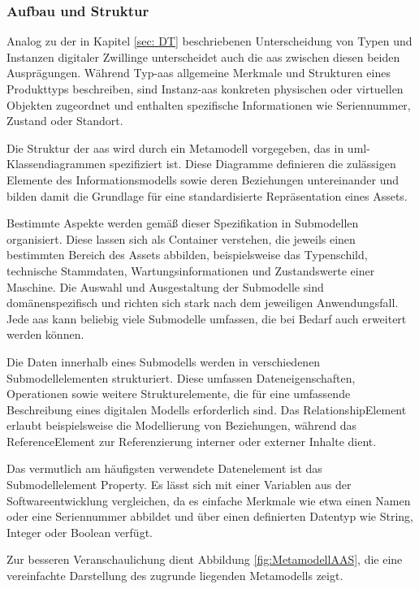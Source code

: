 \subsubsection{Aufbau und Struktur}
Analog zu der in Kapitel \ref{sec: DT} beschriebenen Unterscheidung von Typen und Instanzen digitaler Zwillinge unterscheidet auch die \acs{aas} zwischen diesen beiden Ausprägungen.
Während Typ-\acs{aas} allgemeine Merkmale und Strukturen eines Produkttyps beschreiben, sind Instanz-\acs{aas} konkreten physischen oder virtuellen Objekten zugeordnet und enthalten spezifische Informationen wie Seriennummer, Zustand oder Standort.

Die Struktur der \acs{aas} wird durch ein Metamodell \cite{SpezifikationPart1} vorgegeben, das in \ac{uml}-Klassendiagrammen spezifiziert ist.
Diese Diagramme definieren die zulässigen Elemente des Informationsmodells sowie deren Beziehungen untereinander und bilden damit die Grundlage für eine standardisierte Repräsentation eines Assets.

Bestimmte Aspekte werden gemäß dieser Spezifikation in Submodellen organisiert.
Diese lassen sich als Container verstehen, die jeweils einen bestimmten Bereich des Assets abbilden, beispielsweise das Typenschild, technische Stammdaten, Wartungsinformationen und Zustandswerte einer Maschine.  
Die Auswahl und Ausgestaltung der Submodelle sind domänenspezifisch und richten sich stark nach dem jeweiligen Anwendungsfall.
Jede \acs{aas} kann beliebig viele Submodelle umfassen, die bei Bedarf auch erweitert werden können.

Die Daten innerhalb eines Submodells werden in verschiedenen Submodellelementen strukturiert.
Diese umfassen Dateneigenschaften, Operationen sowie weitere Strukturelemente, die für eine umfassende Beschreibung eines digitalen Modells erforderlich sind.
Das RelationshipElement erlaubt beispielsweise die Modellierung von Beziehungen, während das ReferenceElement zur Referenzierung interner oder externer Inhalte dient.

Das vermutlich am häufigsten verwendete Datenelement ist das Submodellelement 
\linebreak Property.
Es lässt sich mit einer Variablen aus der Softwareentwicklung vergleichen, da es einfache Merkmale wie etwa einen Namen oder eine Seriennummer abbildet und über einen definierten Datentyp wie String, Integer oder Boolean verfügt.

Zur besseren Veranschaulichung dient Abbildung \ref{fig:MetamodellAAS}, die eine vereinfachte Darstellung des zugrunde liegenden Metamodells zeigt.

